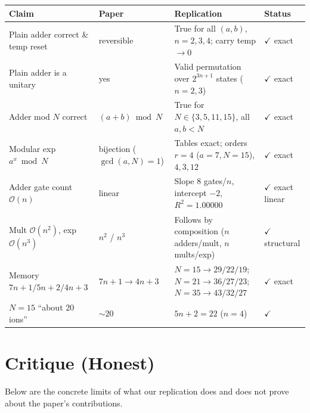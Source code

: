 \documentclass[11pt]{article}
\begin{document}
\begin{longtable}{p{5.4cm} p{2.6cm} p{5.0cm} p{1.4cm}}
\toprule
\textbf{Claim} & \textbf{Paper} & \textbf{Replication} & \textbf{Status} \\
\midrule
\endhead
Plain adder correct \& temp reset & reversible &
True for all $(a,b)$, $n{=}2,3,4$; carry temp $\to 0$ & $\checkmark$ exact \\
Plain adder is a unitary & yes &
Valid permutation over $2^{3n+1}$ states ($n{=}2,3$) & $\checkmark$ exact \\
Adder mod $N$ correct & $(a+b)\bmod N$ &
True for $N \in \{3,5,11,15\}$, all $a,b < N$ & $\checkmark$ exact \\
Modular exp $a^x \bmod N$ & bijection ($\gcd(a,N){=}1$) &
Tables exact; orders $r{=}4$ ($a{=}7,N{=}15$), $4, 3, 12$ & $\checkmark$ exact \\
Adder gate count $\mathcal{O}(n)$ & linear &
Slope $8$ gates/$n$, intercept $-2$, $R^{2} = 1.00000$ & $\checkmark$ exact linear \\
Mult $\mathcal{O}(n^{2})$, exp $\mathcal{O}(n^{3})$ & $n^{2}$ / $n^{3}$ &
Follows by composition ($n$ adders/mult, $n$ mults/exp) & $\checkmark$ structural \\
Memory $7n{+}1 / 5n{+}2 / 4n{+}3$ & $7n{+}1 \to 4n{+}3$ &
$N{=}15\!\to\!29/22/19$; $N{=}21\!\to\!36/27/23$; $N{=}35\!\to\!43/32/27$ & $\checkmark$ exact \\
$N{=}15$ ``about 20 ions'' & $\sim\!20$ &
$5n{+}2 = 22$ ($n{=}4$) & $\checkmark$ \\
\bottomrule
\end{longtable}

\section{Critique (Honest)}
\label{sec:critique}

Below are the concrete limits of what our replication does and does not prove
about the paper's contributions.
\end{document}
